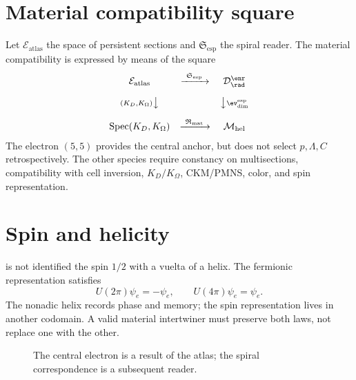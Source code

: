 \section{Material compatibility square}

Let \(\mathcal E_{\mathrm{atlas}}\) the space of persistent sections and
\(\mathfrak S_{\mathrm{esp}}\) the spiral reader. The material compatibility
is expressed by means of the square
\[
\begin{array}{ccc}
\mathcal E_{\mathrm{atlas}}
 & \xrightarrow{\ \mathfrak S_{\mathrm{esp}}\ }
 & \mathcal D_{\rad}^{\enr}\\[1.0em]
{\scriptstyle (K_D,K_\Omega)}\big\downarrow
 && \big\downarrow{\scriptstyle \ev_{\mathrm{dim}}^{\mathrm{esp}}}\\[1.0em]
\operatorname{Spec}(K_D,K_\Omega)
 & \xrightarrow{\ \mathfrak R_{\mathrm{mat}}\ }
 & \mathcal M_{\mathrm{hel}}
\end{array}
\]
The electron \((5,5)\) provides the central anchor, but does not select
\(p,\Lambda,C\) retrospectively. The other species require
constancy on multisections, compatibility with cell inversion,
\(K_D/K_\Omega\), CKM/PMNS, color, and spin representation.

\section{Spin and helicity}

is not identified the spin \(1/2\) with a vuelta of a helix. The
fermionic representation satisfies
\[
 U(2\pi)\psi_e=-\psi_e,
 \qquad
 U(4\pi)\psi_e=\psi_e.
\]
The nonadic helix records phase and memory; the spin representation lives
in another codomain. A valid material intertwiner must preserve both
laws, not replace one with the other.

\begin{figure}[htbp]
\centering
{}
\caption{The central electron is a result of the atlas; the spiral correspondence is a subsequent reader.}
\label{espiral:fig:atlas-electron}
\end{figure}
